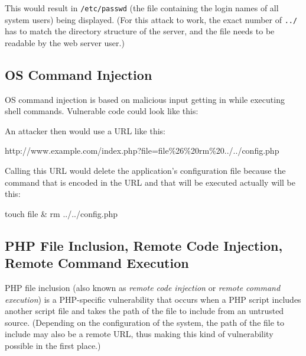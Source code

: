 This would result in \texttt{/etc/passwd} (the file containing the login names of all system users) being displayed. (For this attack to work, the exact number of \texttt{../} has to match the directory structure of the server, and the file needs to be readable by the web server user.)


\subsection{OS Command Injection}
\label{os-command-injection}
OS command injection is based on malicious input getting in while executing shell commands. Vulnerable code could look like this:


An attacker then would use a URL like this:

\begin{textcode}
http://www.example.com/index.php?file=file\%26\%20rm\%20../../config.php
\end{textcode}

Calling this URL would delete the application's configuration file because the command that is encoded in the URL and that will be executed actually will be this:

\begin{textcode}
touch file & rm ../../config.php
\end{textcode}



\subsection{PHP File Inclusion, Remote Code Injection, Remote Command Execution}
\label{remote-command-injection}
PHP file inclusion (also known as \emph{remote code injection} or \emph{remote command execution}) is a PHP-specific vulnerability that occurs when a PHP script includes another script file and takes the path of the file to include from an untrusted source. (Depending on the configuration of the system, the path of the file to include may also be a remote URL, thus making this kind of vulnerability possible in the first place.)

